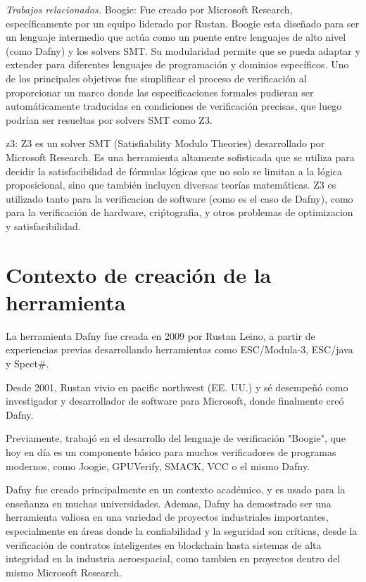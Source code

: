 \documentclass[runningheads]{llncs}
\begin{document}
\emph{Trabajos relacionados.} 
Boogie: Fue creado por Microsoft Research, específicamente por un equipo liderado por Rustan. 
Boogie esta diseñado para ser un lenguaje intermedio que actúa como un puente entre lenguajes de alto nivel (como Dafny) y los solvers SMT. 
Su modularidad permite que se pueda adaptar y extender para diferentes lenguajes de programación y dominios específicos.
Uno de los principales objetivos fue simplificar el proceso de verificación al proporcionar un marco donde las especificaciones formales pudieran ser automáticamente 
traducidas en condiciones de verificación precisas, que luego podrían ser resueltas por solvers SMT como Z3.

z3: Z3 es un solver SMT (Satisfiability Modulo Theories) desarrollado por Microsoft Research. 
Es una herramienta altamente sofisticada que se utiliza para decidir la satisfacibilidad de fórmulas lógicas que no solo se limitan a la lógica proposicional, 
sino que también incluyen diversas teorías matemáticas.
Z3 es utilizado tanto para la verificacion de software (como es el caso de Dafny),
como para la verificación de hardware, criṕtografia, y otros problemas de optimizacion y satisfacibilidad.


\section{Contexto de creación de la herramienta}

La herramienta Dafny fue creada en 2009 por Rustan Leino,
a partir de experiencias previas desarrollando herramientas como ESC/Modula-3, ESC/java y Spect\#.

Desde 2001, Rustan vivio en pacific northwest (EE. UU.) y sé desempeñó como investigador y desarrollador de software para Microsoft,
donde finalmente creó Dafny.

Previamente, trabajó en el desarrollo del lenguaje de verificación "Boogie",
que hoy en día es un componente básico para muchos verificadores de programas modernos,
como Joogie, GPUVerify, SMACK, VCC o el mismo Dafny.

Dafny fue creado principalmente en un contexto académico, 
y es usado para la enseñanza en muchas universidades.
Ademas, Dafny ha demostrado ser una herramienta valiosa en una variedad de proyectos industriales importantes, 
especialmente en áreas donde la confiabilidad y la seguridad son críticas, 
desde la verificación de contratos inteligentes en blockchain hasta sistemas de alta integridad en la industria aeroespacial, 
como tambien en proyectos dentro del mismo Microsoft Research.
\end{document}
